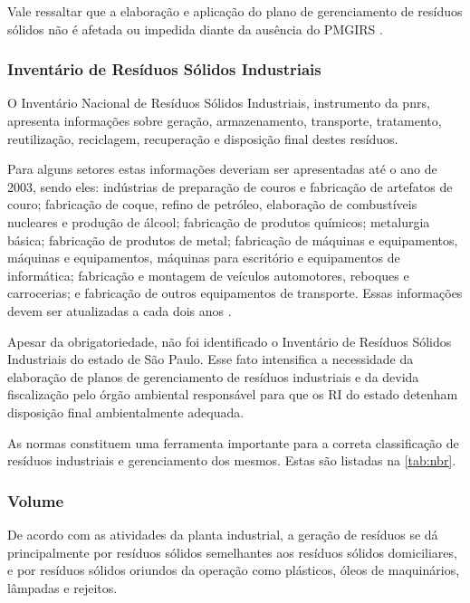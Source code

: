 	Vale ressaltar que a elaboração e aplicação do plano de gerenciamento de resíduos sólidos não é afetada ou impedida diante da ausência do PMGIRS \cite{brasil:12305}.

	\subsubsection{Inventário de Resíduos Sólidos Industriais}
	
	O Inventário Nacional de Resíduos Sólidos Industriais, instrumento da \gls{pnrs}, apresenta informações sobre geração, armazenamento, transporte, tratamento, reutilização, reciclagem, recuperação e disposição final destes resíduos. 
	
	Para alguns setores estas informações deveriam ser apresentadas até o ano de 2003, sendo eles: indústrias de preparação de couros e fabricação de artefatos de couro; fabricação de coque, refino de petróleo, elaboração de combustíveis nucleares e produção de álcool; fabricação de produtos químicos; metalurgia básica; fabricação de produtos de metal; fabricação de máquinas e equipamentos, máquinas e equipamentos, máquinas para escritório e equipamentos de informática; fabricação e montagem de veículos automotores, reboques e carrocerias; e fabricação de outros equipamentos de transporte. Essas informações devem ser atualizadas a cada dois anos \cite{conama:313}.
	
	Apesar da obrigatoriedade, não foi identificado o Inventário de Resíduos Sólidos Industriais do estado de São Paulo. Esse fato intensifica a necessidade da elaboração de planos de gerenciamento de resíduos industriais e da devida fiscalização pelo órgão ambiental responsável para que os RI do estado detenham disposição final ambientalmente adequada.
	
	As normas constituem uma ferramenta importante para a correta classificação de resíduos industriais e gerenciamento dos mesmos. Estas são listadas na \autoref{tab:nbr}.
	
	
	
	\subsubsection{Volume}
	De acordo com as atividades da planta industrial, a geração de resíduos se dá principalmente por resíduos sólidos semelhantes aos resíduos sólidos domiciliares, e por resíduos sólidos oriundos da operação como plásticos, óleos de maquinários, lâmpadas e rejeitos.
	
